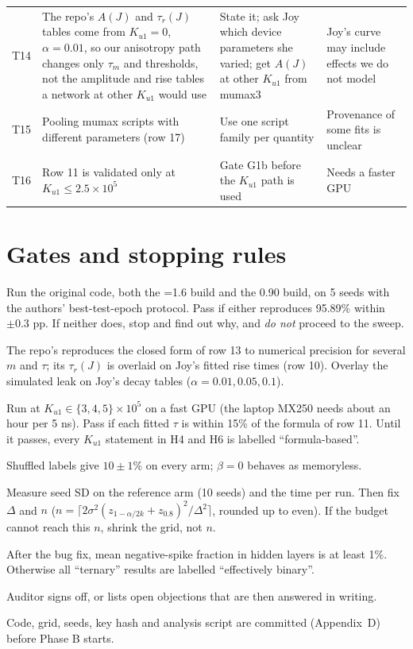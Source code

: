 \documentclass[10pt,a4paper]{article}
\newcommand{\code}[1]{\path{#1}}
\newcommand{\taum}{\tau_m}
\newcommand{\ptn}{\Delta}
\begin{document}
{\begin{longtable}{@{}p{0.8cm}L{4.4cm}L{6.0cm}L{3.0cm}@{}}
T14 & The repo's $A(J)$ and $\tau_r(J)$ tables come from $K_{u1}=0$, $\alpha=0.01$, so our anisotropy path changes only $\taum$ and thresholds, not the amplitude and rise tables a network at other $K_{u1}$ would use & State it; ask Joy which device parameters she varied; get $A(J)$ at other $K_{u1}$ from mumax3 & Joy's curve may include effects we do not model\\
T15 & Pooling mumax scripts with different parameters (row 17) & Use one script family per quantity & Provenance of some fits is unclear\\
T16 & Row 11 is validated only at $K_{u1}\le2.5\times10^5$ & Gate G1b before the $K_{u1}$ path is used & Needs a faster GPU\\
\bottomrule\end{longtable}}

\section{Gates and stopping rules}\label{sec:gates}
\begin{description}[leftmargin=0pt,labelsep=6pt]
\item[G0 Replication.] Run the original code, both the \code{NEG_THRESHOLD}=1.6 build and the 0.90 build, on 5 seeds with the authors' best-test-epoch protocol. Pass if either reproduces 95.89\% within $\pm0.3$ pp. If neither does, stop and find out why, and \emph{do not} proceed to the sweep.
\item[G1 Neuron unit test.] The repo's \code{leak()} reproduces the closed form of row 13 to numerical precision for several $m$ and $\tau$; its $\tau_r(J)$ is overlaid on Joy's fitted rise times (row 10). Overlay the simulated leak on Joy's decay tables ($\alpha=0.01,0.05,0.1$).
\item[G1b Physics check.] Run \code{Ku1_tau_sweep.mx3} at $K_{u1}\in\{3,4,5\}\times10^5$ on a fast GPU (the laptop MX250 needs about an hour per 5 ns). Pass if each fitted $\tau$ is within 15\% of the formula of row 11. Until it passes, every $K_{u1}$ statement in H4 and H6 is labelled ``formula-based''.
\item[G2 Negative controls.] Shuffled labels give $10\pm1$\% on every arm; $\beta=0$ behaves as memoryless.
\item[G3 Noise and cost.] Measure seed SD on the reference arm (10 seeds) and the time per run. Then fix $\ptn$ and $n$ ($n=\lceil 2\sigma^2(z_{1-\alpha/2k}+z_{0.8})^2/\ptn^2\rceil$, rounded up to even). If the budget cannot reach this $n$, shrink the grid, not $n$.
\item[G4 Ternary validity.] After the bug fix, mean negative-spike fraction in hidden layers is at least 1\%. Otherwise all ``ternary'' results are labelled ``effectively binary''.
\item[G5 Independent review.] Auditor signs off, or lists open objections that are then answered in writing.
\item[G6 Freeze.] Code, grid, seeds, key hash and analysis script are committed (Appendix~D) before Phase B starts.
\end{description}
\end{document}
